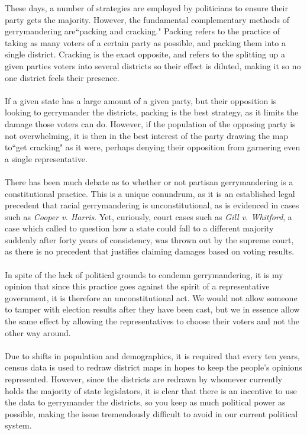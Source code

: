 \documentclass[12pt]{article}
\begin{document}
	
	\noindent
	These days, a number of strategies are employed by politicians to ensure their party gets the majority.  However, the fundamental complementary methods of gerrymandering are``packing and cracking."  Packing refers to the practice of taking as many voters of a certain party as possible, and packing them into a single district. \cite{pierce}  Cracking is the exact opposite, and refers to the splitting up a given parties voters into several districts so their effect is diluted, making it so no one district feels their presence. \cite{pierce}
	\\
	\\
	If a given state has a large amount of a given party, but their opposition is looking to gerrymander the districts, packing is the best strategy, as it limits the damage those voters can do.  However, if the population of the opposing party is not overwhelming, it is then in the best interest of the party drawing the map to``get cracking" as it were, perhaps denying their opposition from garnering even a single representative.
	\\ \\
	There has been much debate as to whether or not partisan gerrymandering is a constitutional practice.  This is a unique conundrum, as it is an established legal precedent that racial gerrymandering is unconstitutional, as is evidenced in cases such as \emph{Cooper v. Harris}.\cite{fourteen}  Yet, curiously, court cases such as \emph{Gill v. Whitford}, a case which called to question how a state could fall to a different majority suddenly after forty years of consistency, was thrown out by the supreme court, as there is no precedent that justifies claiming damages based on voting results. \cite{gill}
	\\
	\\
	In spite of the lack of political grounds to condemn gerrymandering, it is my opinion that since this practice goes against the spirit of a representative government, it is therefore an unconstitutional act.  We would not allow someone to tamper with election results after they have been cast, but we in essence allow the same effect by allowing the representatives to choose their voters and not the other way around.
	\\
	\\Due to shifts in population and demographics, it is required that every ten years, census data is used to redraw district maps in hopes to keep the people's opinions represented.  However, since the districts are redrawn by whomever currently holds the majority of state legislators, it is clear that there is an incentive to use the data to gerrymander the districts, so you keep as much political power as possible, making the issue tremendously difficult to avoid in our current political system. 
\end{document}
